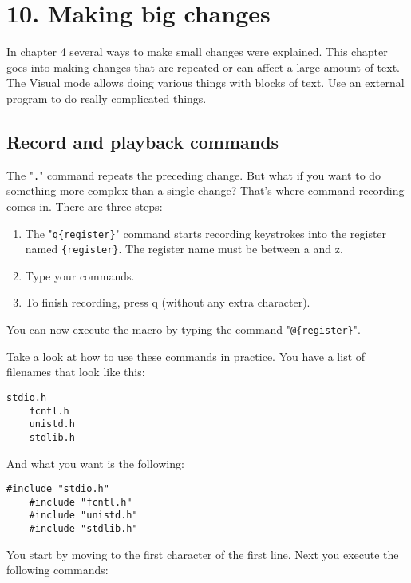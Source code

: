 \section{10. Making big changes}
In chapter 4 several ways to make small changes were explained.  This chapter
goes into making changes that are repeated or can affect a large amount of
text.  The Visual mode allows doing various things with blocks of text.  Use
an external program to do really complicated things.
\subsection{Record and playback commands}
The "\texttt{.}" command repeats the preceding change.
But what if you want to do something more complex than a single change?  That's where command recording comes in.
There are three steps:

\begin{enumerate}
				\item The "\texttt{q\{register\}}" command starts recording keystrokes into the register named \texttt{\{register\}}.
								The register name must be between a and z.
				\item Type your commands.
				\item To finish recording, press q (without any extra character).
\end{enumerate}

You can now execute the macro by typing the command "\texttt{@\{register\}}".

Take a look at how to use these commands in practice.
You have a list of filenames that look like this:

\begin{Verbatim}[samepage=true]
    stdio.h 
    fcntl.h 
    unistd.h 
    stdlib.h 
\end{Verbatim}

And what you want is the following:

\begin{Verbatim}[samepage=true]
    #include "stdio.h" 
    #include "fcntl.h" 
    #include "unistd.h" 
    #include "stdlib.h" 
\end{Verbatim}

You start by moving to the first character of the first line.
Next you execute the following commands:

